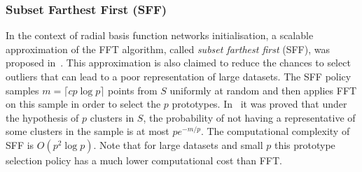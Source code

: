 \subsubsection{Subset Farthest First (SFF)}
In the context of radial basis function networks initialisation, a
scalable approximation of the FFT algorithm, called \emph{subset
  farthest first} (SFF), was proposed in~\cite{turnbull2005fast}. This
approximation is also claimed to reduce the chances to select outliers
that can lead to a poor representation of large datasets. The SFF
policy samples $m = \lceil c p \log p \rceil$ points from $S$
uniformly at random and then applies FFT on this sample in order to
select the $p$ prototypes. In~\cite{turnbull2005fast} it was proved
that under the hypothesis of $p$ clusters in $S$, the probability of
not having a representative of some clusters in the sample is at most
$p e^{-m/p}$. The computational complexity of SFF is $O(p^2 \log
p)$. Note that for large datasets and small $p$ this prototype
selection policy has a much lower computational cost than FFT.

